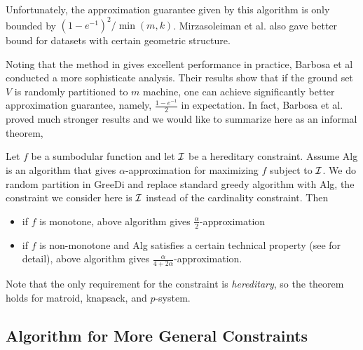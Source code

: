 Unfortunately, the approximation guarantee given by this algorithm is only bounded by $(1 - e^{-1})^2/\min(m, k)$. Mirzasoleiman et al. \cite{MKS+13} also gave better bound for datasets with certain geometric structure.

Noting that the method in \cite{MKS+13} gives excellent performance in practice, Barbosa et al \cite{DEN+15} conducted a more sophisticate analysis. Their results show that if the ground set $V$ is randomly partitioned to $m$ machine, one can achieve significantly better approximation guarantee, namely, $\frac{1 - e^{-1}}{2}$ in expectation. In fact, Barbosa et al. \cite{DEN+15} proved much stronger results and we would like to summarize here as an informal theorem,
\begin{theorem}
  \label{thm:randomGreeDi}
  Let $f$ be a sumbodular function and let $\mathcal{I}$ be a hereditary constraint. Assume {\sc Alg} is an algorithm that gives $\alpha$-approximation for maximizing $f$ subject to $\mathcal{I}$. We do random partition in {\sc GreeDi} and replace standard greedy algorithm with {\sc Alg}, the constraint we consider here is $\mathcal{I}$ instead of the cardinality constraint. Then 
  \begin{itemize}
  \item if $f$ is monotone, above algorithm gives $\frac{\alpha}{2}$-approximation
  \item if $f$ is non-monotone and {\sc Alg} satisfies a certain technical property (see \cite{DEN+15} for detail), above algorithm gives $\frac{\alpha}{4 + 2\alpha}$-approximation.
  \end{itemize}
\end{theorem}
Note that the only requirement for the constraint is \emph{hereditary}, so the theorem holds for matroid, knapsack, and $p$-system.



\subsection{Algorithm for More General Constraints}
